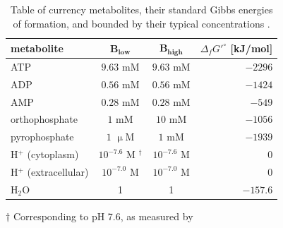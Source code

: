 \documentclass[twocolumn]{bmcart}%
\begin{document}
\begin{backmatter}
\begin{table}[h!]
\caption{Table of currency metabolites, their standard Gibbs energies of formation, and bounded by their typical concentrations \cite{Bennett2009-rm}.}
\begin{tabular}{l|c|c|r}
\label{table:potentials}
\textbf{metabolite} & $\mathbf{B_{low}}$ & $\mathbf{B_{high}}$ & $\Delta_f G'^\circ$ [kJ/mol] \\ \hline
ATP & $9.63$ mM & $9.63$ mM & $-2296$ \\
ADP & $0.56$ mM & $0.56$ mM & $-1424$ \\
AMP & $0.28$ mM & $0.28$ mM & $-549$ \\
orthophosphate & $1$ mM & $10$ mM & $-1056$ \\
pyrophosphate & $1$ $\upmu$M & $1$ mM & $-1939$ \\
H$^+$ (cytoplasm) & $10^{-7.6}$ M $^\dagger$ & $10^{-7.6}$ M & $0$ \\
H$^+$ (extracellular) & $10^{-7.0}$ M & $10^{-7.0}$ M & $0$ \\
H$_2$O & 1 & 1 & $-157.6$
\end{tabular}
\begin{tablenotes}
\tiny
\item $\dagger$ Corresponding to pH 7.6, as measured by \citep{Wilks2007-lh}
\end{tablenotes}
\end{table}




\end{backmatter}
\end{document}
